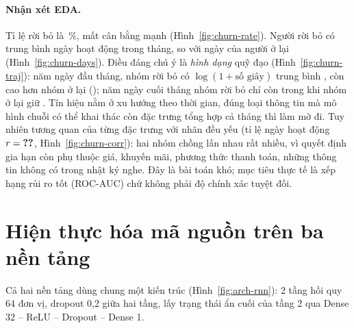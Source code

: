
\paragraph{Nhận xét EDA.} Tỉ lệ rời bỏ là \,\%, mất cân bằng mạnh (Hình~\ref{fig:churn-rate}).
Người rời bỏ có trung bình  ngày hoạt động trong tháng, so với
 ngày của người ở lại (Hình~\ref{fig:churn-days}). Điều đáng chú ý là \emph{hình dạng} quỹ đạo
(Hình~\ref{fig:churn-traj}): năm ngày đầu tháng, nhóm rời bỏ có $\log(1 + \text{số giây})$ trung bình
, còn cao hơn nhóm ở lại (); năm ngày cuối tháng nhóm rời bỏ
chỉ còn  trong khi nhóm ở lại giữ . Tín hiệu nằm ở xu hướng
theo thời gian, đúng loại thông tin mà mô hình chuỗi có thể khai thác còn đặc trưng tổng hợp cả tháng thì làm mờ đi. Tuy nhiên
tương quan của từng đặc trưng với nhãn đều yếu (tỉ lệ ngày hoạt động $r = \SL{eda/churn/corr_active}$,
Hình~\ref{fig:churn-corr}): hai nhóm chồng lấn nhau rất nhiều, vì quyết định gia hạn còn phụ thuộc giá, khuyến mãi, phương
thức thanh toán, những thông tin không có trong nhật ký nghe. Đây là bài toán khó; mục tiêu thực tế là xếp hạng rủi ro tốt
(ROC-AUC) chứ không phải độ chính xác tuyệt đối.

\section{Hiện thực hóa mã nguồn trên ba nền tảng}

Cả hai nền tảng dùng chung một kiến trúc (Hình~\ref{fig:arch-rnn}): 2 tầng hồi quy 64 đơn vị, dropout 0,2 giữa hai tầng,
lấy trạng thái ẩn cuối của tầng 2 qua Dense 32 -- ReLU -- Dropout -- Dense 1.

